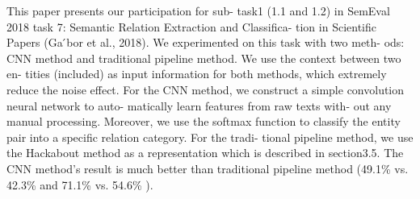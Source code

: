 This paper presents our participation for sub- task1 (1.1 and 1.2) in SemEval 2018 task 7: Semantic Relation Extraction and Classifica- tion in Scientific Papers (Ga ́bor et al., 2018). We experimented on this task with two meth- ods: CNN method and traditional pipeline method. We use the context between two en- tities (included) as input information for both methods, which extremely reduce the noise effect. For the CNN method, we construct a simple convolution neural network to auto- matically learn features from raw texts with- out any manual processing. Moreover, we use the softmax function to classify the entity pair into a specific relation category. For the tradi- tional pipeline method, we use the Hackabout method as a representation which is described in section3.5. The CNN method's result is much better than traditional pipeline method (49.1\% vs. 42.3\% and 71.1\% vs. 54.6\% ).

